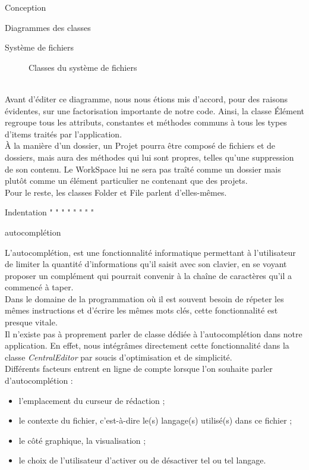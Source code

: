 \documentclass[a4paper, 12pt]{report}
\begin{document}
\begin{part}{Conception}
\begin{chapter}{Diagrammes des classes}
\begin{section}{Système de fichiers}
\begin{figure}[ht]
\begin{center}
						\caption{Classes du système de fichiers}
						\label{arbo}
					\end{center}
				\end{figure}~\\
				Avant d'éditer ce diagramme, nous nous étions mis d'accord, pour des raisons évidentes, sur une factorisation importante de 
				notre code. Ainsi, la classe Élément regroupe tous les attributs, constantes et méthodes communs à tous les types d'items 
				traités par l'application.\\
				À la manière d'un dossier, un Projet pourra être composé de fichiers et de dossiers, mais aura des méthodes qui lui sont propres,
				telles qu'une suppression de son contenu. Le WorkSpace lui ne sera pas traîté comme un dossier mais plutôt comme un élément
				particulier ne contenant que des projets.\\
				Pour le reste, les classes Folder et File parlent d'elles-mêmes.
			\end{section}
			\begin{section}{Indentation}
			"                                   																	"
			"                                   																	"
			"                                   																	"
			"                                   																	"
			\end{section}
			\begin{section}{\Gls{autocomplétion}}

				L'autocomplétion, est une fonctionnalité informatique permettant à l'utilisateur de limiter la quantité d'informations qu'il
				saisit avec son clavier, en se voyant proposer un complément qui pourrait convenir à la chaîne de caractères qu'il a
				commencé à taper.\\
				Dans le	domaine de la programmation où il est souvent besoin de répeter les mêmes instructions et d'écrire les mêmes mots clés,
				cette fonctionnalité est presque vitale.\\


				Il n'existe pas à proprement parler de classe dédiée à l'\gls{autocomplétion} dans notre application.
				En effet, nous intégrâmes directement cette fonctionnalité dans la classe \emph{CentralEditor} par soucis d'optimisation
				et de simplicité.\\

				Différents facteurs entrent en ligne de compte lorsque l'on souhaite parler d'\gls{autocomplétion} :
				\begin{itemize}
					\item l'emplacement du curseur de rédaction ;
					\item le contexte du fichier, c'est-à-dire le(s) langage(s) utilisé(s) dans ce fichier ;
					\item le côté graphique, la visualisation ;
					\item le choix de l'utilisateur d'activer ou de désactiver tel ou tel langage.
				\end{itemize}~\\


\end{section}
\end{chapter}
\end{part}
\end{document}
